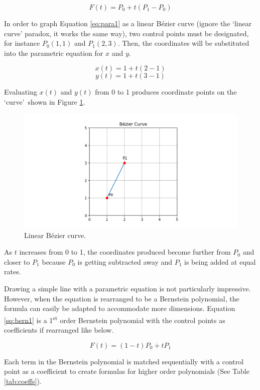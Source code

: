 \documentclass[12pt,letterpaper]{article}
\begin{document}
\begin{equation}
    \label{eq:para1}
    F(t) = P_0 + t(P_1 - P_0)
\end{equation}

In order to graph Equation \ref{eq:para1} as a linear B\'ezier curve (ignore the `linear curve' paradox, it works the same way), two control points must be designated, for instance $P_0(1, 1)$ and $P_1(2, 3)$. Then, the coordinates will be substituted into the parametric equation for $x$ and $y$.

$$x(t) = 1 + t(2-1)$$
$$y(t) = 1 + t(3-1)$$

Evaluating $x(t)$ and $y(t)$ from 0 to 1 produces coordinate points on the \lq curve\rq \, shown in Figure \ref{fig:bez2}. 

\begin{figure}[H]
    \includegraphics[width=15cm]{Figure_3}
    \centering
    \caption{Linear B\'ezier curve.}
    \label{fig:bez2}
\end{figure}

As $t$ increases from 0 to 1, the coordinates produced become further from $P_0$ and closer to $P_1$ because $P_0$ is getting subtracted away and $P_1$ is being added at equal rates. 

Drawing a simple line with a parametric equation is not particularly impressive. However, when the equation is rearranged to be a Bernstein polynomial, the formula can easily be adapted to accommodate more dimensions. Equation \ref{eq:bern1} is a 1\textsuperscript{st} order Bernstein polynomial with the control points as coefficients if rearranged like below.

\begin{equation}
    \label{eq:bern1}
    F(t) = (1-t)P_0 + t P_1
\end{equation}

Each term in the Bernstein polynomial is matched sequentially with a control point as a coefficient to create formulas for higher order polynomials (See Table \ref{tab:coeffs}).
\end{document}
